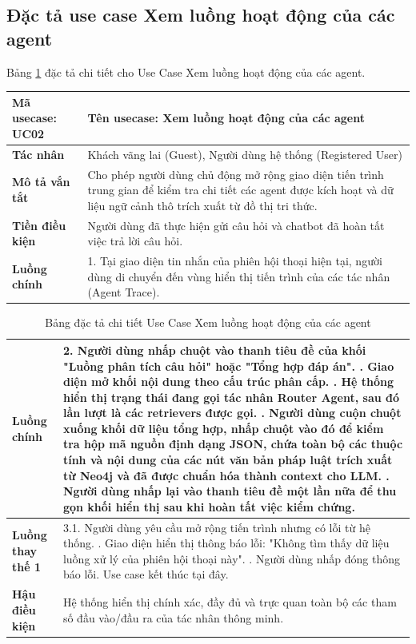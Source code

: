\documentclass[../DoAn.tex]{subfiles}
\begin{document}
\subsection{Đặc tả use case Xem luồng hoạt động của các agent}
Bảng \ref{table:uc_specs_trace} đặc tả chi tiết cho Use Case Xem luồng hoạt động của các agent. 
\begin{table}[H]
\centering
\begin{tabular}{|p{3.5cm}|p{11.5cm}|}
\hline
\textbf{Mã usecase:} UC02 & \textbf{Tên usecase:} Xem luồng hoạt động của các agent \\ \hline
\textbf{Tác nhân} & Khách vãng lai (Guest), Người dùng hệ thống (Registered User) \\ \hline
\textbf{Mô tả vắn tắt} & Cho phép người dùng chủ động mở rộng giao diện tiến trình trung gian để kiểm tra chi tiết các agent được kích hoạt và dữ liệu ngữ cảnh thô trích xuất từ đồ thị tri thức. \\ \hline
\textbf{Tiền điều kiện} & Người dùng đã thực hiện gửi câu hỏi và chatbot đã hoàn tất việc trả lời câu hỏi. \\ \hline
\textbf{Luồng chính} & 
1. Tại giao diện tin nhắn của phiên hội thoại hiện tại, người dùng di chuyển đến vùng hiển thị tiến trình của các tác nhân (Agent Trace). \\ \hline
\end{tabular}
\end{table}

\begin{table}[H]
\centering
\begin{tabular}{|p{3.5cm}|p{11.5cm}|}
\hline
\textbf{Luồng chính} & 
2. Người dùng nhấp chuột vào thanh tiêu đề của khối "Luồng phân tích câu hỏi" hoặc "Tổng hợp đáp án". \newline
3. Giao diện mở khối nội dung theo cấu trúc phân cấp. \newline
4. Hệ thống hiển thị trạng thái đang gọi tác nhân Router Agent, sau đó lần lượt là các retrievers được gọi. \newline
5. Người dùng cuộn chuột xuống khối dữ liệu tổng hợp, nhấp chuột vào đó để kiểm tra hộp mã nguồn định dạng JSON, chứa toàn bộ các thuộc tính và nội dung của các nút văn bản pháp luật trích xuất từ Neo4j và đã được chuẩn hóa thành context cho LLM. \newline
6. Người dùng nhấp lại vào thanh tiêu đề một lần nữa để thu gọn khối hiển thị sau khi hoàn tất việc kiểm chứng. \\ \hline
\textbf{Luồng thay thế 1} & 
3.1. Người dùng yêu cầu mở rộng tiến trình nhưng có lỗi từ hệ thống. \newline
3.2. Giao diện hiển thị thông báo lỗi: "Không tìm thấy dữ liệu luồng xử lý của phiên hội thoại này". \newline
3.3. Người dùng nhấp đóng thông báo lỗi. Use case kết thúc tại đây. \\ \hline
\textbf{Hậu điều kiện} & Hệ thống hiển thị chính xác, đầy đủ và trực quan toàn bộ các tham số đầu vào/đầu ra của tác nhân thông minh. \\ \hline
\end{tabular}
\caption{Bảng đặc tả chi tiết Use Case Xem luồng hoạt động của các agent}
\label{table:uc_specs_trace}
\end{table}
\end{document}
